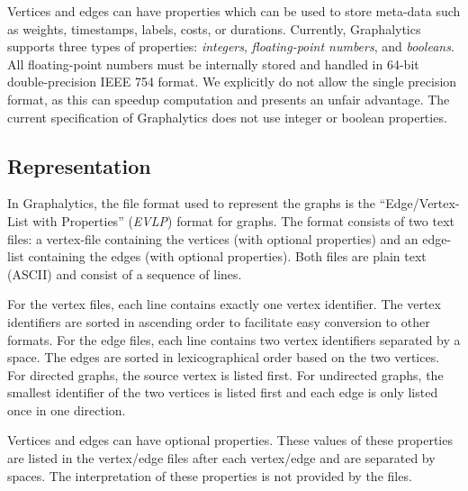 Vertices and edges can have properties which can be used to store meta-data such as weights, timestamps, labels, costs, or durations. Currently, Graphalytics supports three types of properties: \emph{integers}, \emph{floating-point numbers}, and \emph{booleans}. All floating-point numbers must be internally stored and handled in 64-bit double-precision IEEE 754 format. We explicitly do not allow the single precision format, as this can speedup computation and presents an unfair advantage. The current specification of Graphalytics does not use integer or boolean properties.


\subsection{Representation}\label{sec:data:representation}
In Graphalytics, the file format used to represent the graphs is the ``Edge/Vertex-List with Properties'' (\emph{EVLP}) format for graphs. The format consists of two text files: a vertex-file containing the vertices (with optional properties) and an edge-list containing the edges (with optional properties). Both files are plain text (ASCII) and consist of a sequence of lines.

For the vertex files, each line contains exactly one vertex identifier. The vertex identifiers are sorted in ascending order to facilitate easy conversion to other formats. For the edge files, each line contains two vertex identifiers separated by a space. The edges are sorted in lexicographical order based on the two vertices. For directed graphs, the source vertex is listed first. For undirected graphs, the smallest identifier of the two vertices is listed first and each edge is only listed once in one direction.

Vertices and edges can have optional properties. These values of these properties are listed in the vertex/edge files after each vertex/edge and are separated by spaces. The interpretation of these properties is not provided by the files.

